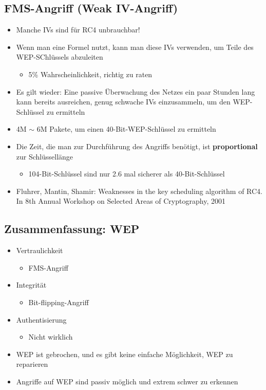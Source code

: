 \documentclass[openany]{book}
\begin{document}
\subsection{FMS-Angriff (Weak IV-Angriff)}

\begin{itemize}
    \item Manche IVs sind für RC4 unbrauchbar!
    \item Wenn man eine Formel nutzt, kann man diese IVs verwenden, um Teile des WEP-SChlüssels abzuleiten
    \begin{itemize}
        \item 5\% Wahrscheinlichkeit, richtig zu raten
    \end{itemize}
    \item Es gilt wieder: Eine passive Überwachung des Netzes ein paar Stunden lang kann bereits ausreichen, genug schwache IVs einzusammeln, um den WEP-Schlüssel zu ermitteln
    \item 4M $\sim$ 6M Pakete, um einen 40-Bit-WEP-Schlüssel zu ermitteln
    \item Die Zeit, die man zur Durchführung des Angriffs benötigt, ist \textbf{proportional} zur Schlüssellänge
    \begin{itemize}
        \item 104-Bit-Schlüssel sind nur 2.6 mal sicherer als 40-Bit-Schlüssel
    \end{itemize} 
    \item Fluhrer, Mantin, Shamir: Weaknesses in the key scheduling algorithm of RC4. In 8th Annual Workshop on Selected Areas of Cryptography, 2001
\end{itemize}

\subsection{Zusammenfassung: WEP}

\begin{itemize}
    \item Vertraulichkeit
    \begin{itemize}
        \item FMS-Angriff
    \end{itemize}
    \item Integrität
    \begin{itemize}
        \item Bit-flipping-Angriff
    \end{itemize}
    \item Authentisierung
    \begin{itemize}
        \item Nicht wirklich
    \end{itemize}
    \item WEP ist gebrochen, und es gibt keine einfache Möglichkeit, WEP zu reparieren
    \item Angriffe auf WEP sind passiv möglich und extrem schwer zu erkennen
\end{itemize}
\end{document}
